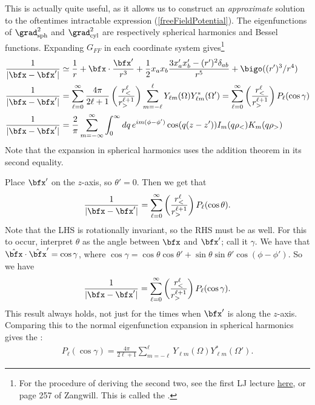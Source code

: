 \documentclass[11pt]{article}
\begin{document}
This is
actually quite useful, as it allows us to construct an \emph{approximate} solution
to the oftentimes intractable expression (\ref{freeFieldPotential}). 
The eigenfunctions of $\grad_{\rm sph}^2$ and $\grad_{\rm cyl}^2$
are respectively spherical harmonics and Bessel functions.
Expanding $G_{FF}$ in each coordinate system gives\footnote{For
the procedure of deriving the second two, see the first LJ lecture
\href{https://bohr.physics.berkeley.edu/classes/209/f02/lectures/Lecture.9.04.02.pdf}{here}, or page 257 of Zangwill.
This is called the .}
\begin{align*}
    \frac{1}{|\bfx - \bfx'|} & \simeq \frac{1}{r} + \bfx \cdot \frac{\bfx'}{r^3} + \frac{1}{2} x_a x_b \frac{3 x_a' x_b' - (r')^2 \delta_{ab}}{r^5} + \bigo((r')^3/r^4)\\
    \frac{1}{|\bfx - \bfx'|} & = \sum_{\ell = 0}^\infty \frac{4\pi}{2\ell + 1} \left( \frac{r_<^\ell}{r_>^{\ell + 1}} \right) \sum_{m = -\ell}^\ell Y_{\ell m}(\Omega) Y_{\ell m}^*(\Omega')
    = \sum_{\ell = 0}^\infty \left(  \frac{r_<^\ell}{r_>^{\ell + 1}} \right) P_\ell(\cos{\gamma})\\
    \frac{1}{|\bfx - \bfx'|} & = \frac{2}{\pi} \sum_{m = - \infty}^\infty
    \int_0^\infty dq \, e^{im(\phi - \phi')} \cos(q(z - z')) I_m(q\rho_<) K_m(q\rho_>)
\end{align*}
Note that the expansion in spherical harmonics uses the
addition theorem in its second equality. 

\begin{iidea}
    Place $\bfx'$ on the $z$-axis, so $\theta' = 0$. Then
    we get that
    \begin{align*}
        \frac{1}{|\bfx - \bfx'|} = \sum_{\ell = 0}^\infty \left( \frac{r_<^\ell}{r_>^{\ell + 1}} \right) P_\ell(\cos{\theta}).
    \end{align*}
    Note that the LHS is rotationally invariant, so the RHS must be as well.
    For this to occur, interpret $\theta$ as the angle between $\bfx$ and $\bfx'$;
    call it $\gamma$. We have that $\hat{\bfx} \cdot \hat{\bfx}' = \cos{\gamma}$,
    where $\cos{\gamma} = \cos{\theta} \cos{\theta'} + \sin{\theta} \sin{\theta'} \cos(\phi - \phi')$.
    So we have
    \begin{align*}
        \frac{1}{|\bfx - \bfx'|} = \sum_{\ell = 0}^\infty \left( \frac{r_<^\ell}{r_>^{\ell + 1}} \right) P_\ell(\cos{\gamma}).
    \end{align*}
    This result always holds, not just for the times when $\bfx'$ is along the
    $z$-axis. Comparing this to the normal eigenfunction expansion in spherical
    harmonics gives the :
    \begin{align*}
        \boxed{P_\ell(\cos{\gamma}) = \frac{4\pi}{2\ell + 1} \sum_{m = - \ell}^\ell Y_{\ell m}(\Omega) Y_{\ell m}^*(\Omega').}
    \end{align*}
\end{iidea}
\end{document}
